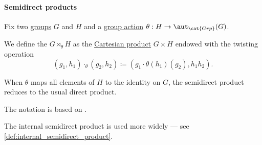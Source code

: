 \paragraph{Semidirect products}

\begin{definition}\label{def:group_external_semidirect_product}
  Fix two \hyperref[def:group]{groups} \( G \) and \( H \) and a \hyperref[def:group_action]{group action} \( \theta: H \to \aut_{\cat{Grp}}(G) \).

  We define the  \( G \rtimes_\theta H \) as the \hyperref[def:cartesian_product]{Cartesian product} \( G \times H \) endowed with the twisting operation
  \begin{equation}\label{eq:def:group_external_semidirect_product}
    (g_1, h_1) \cdot_\theta (g_2, h_2) \coloneqq (g_1 \cdot \theta(h_1)(g_2), h_1 h_2).
  \end{equation}
\end{definition}
\begin{comments}
  \item When \( \theta \) maps all elements of \( H \) to the identity on \( G \), the semidirect product reduces to the usual direct product.

  \item The notation is based on \cite[230]{Aluffi2009Algebra}.

  \item The internal semidirect product is used more widely --- see \cref{def:internal_semidirect_product}.
\end{comments}
